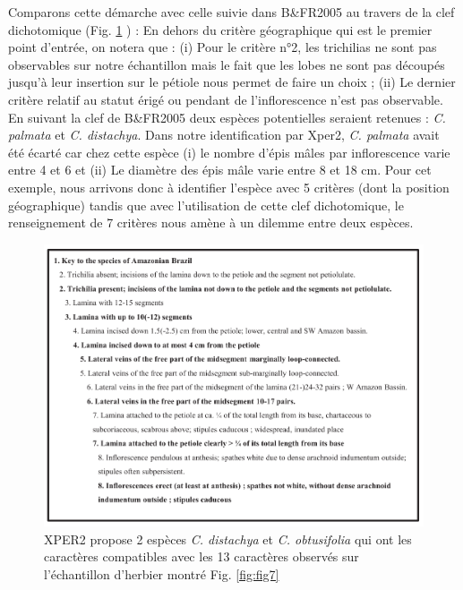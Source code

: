 \documentclass[a4paper]{article}
\theoremstyle{definition}
\theoremstyle{definition}
\theoremstyle{definition}
\theoremstyle{remark}
\begin{document}
Comparons cette démarche avec celle suivie dans B\&FR2005 au travers de
la clef dichotomique (Fig. \ref{fig:fig9} ) : En dehors du critère
géographique qui est le premier point d'entrée, on notera que : (i) Pour
le critère n°2, les trichilias ne sont pas observables sur notre
échantillon mais le fait que les lobes ne sont pas découpés jusqu'à leur
insertion sur le pétiole nous permet de faire un choix ; (ii) Le dernier
critère relatif au statut érigé ou pendant de l'inflorescence n'est pas
observable. En suivant la clef de B\&FR2005 deux espèces potentielles
seraient retenues : \emph{C. palmata} et \emph{C. distachya}. Dans notre
identification par Xper2, \emph{C. palmata} avait été écarté car chez
cette espèce (i) le nombre d'épis mâles par inflorescence varie entre 4
et 6 et (ii) Le diamètre des épis mâle varie entre 8 et 18 cm. Pour cet
exemple, nous arrivons donc à identifier l'espèce avec 5 critères (dont
la position géographique) tandis que avec l'utilisation de cette clef
dichotomique, le renseignement de 7 critères nous amène à un dilemme
entre deux espèces.





\begin{figure}[H]

{\centering \includegraphics[width=1\linewidth]{figure/fig9} 

}

\caption{XPER2 propose 2 espèces \emph{C. distachya} et \emph{C.
obtusifolia} qui ont les caractères compatibles avec les 13 caractères
observés sur l'échantillon d'herbier montré Fig. \ref{fig:fig7}}\label{fig:fig9}
\end{figure}
\end{document}
